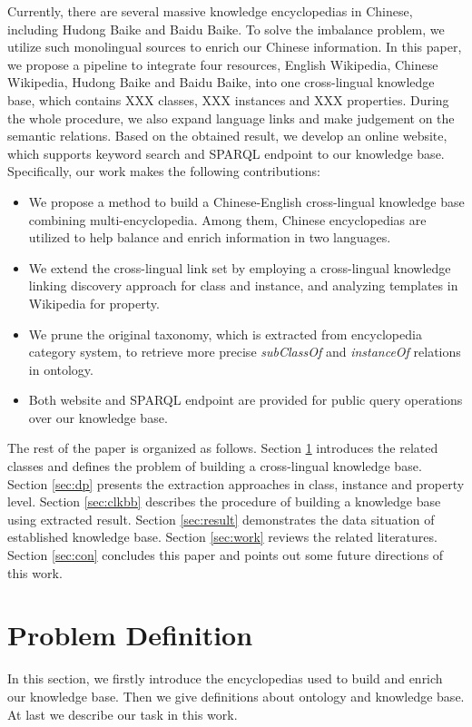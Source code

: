 \documentclass[runningheads,a4paper]{llncs}
\begin{document}
Currently, there are several massive knowledge encyclopedias in Chinese, including Hudong Baike and Baidu Baike. To solve the imbalance problem, we utilize such monolingual sources to enrich our Chinese information. In this paper, we propose a pipeline to integrate four resources, English Wikipedia, Chinese Wikipedia, Hudong Baike and Baidu Baike, into one cross-lingual knowledge base, which contains XXX classes, XXX instances and XXX properties. During the whole procedure, we also expand language links and make judgement on the semantic relations. Based on the obtained result, we develop an online website, which supports keyword search and SPARQL endpoint to our knowledge base. Specifically, our work makes the following contributions:
\begin{itemize}
  \item We propose a method to build a Chinese-English cross-lingual knowledge base combining multi-encyclopedia. Among them, Chinese encyclopedias are utilized to help balance and enrich information in two languages.
  \item We extend the cross-lingual link set by employing a cross-lingual knowledge linking discovery approach for class and instance, and analyzing templates in Wikipedia for property.
  \item We prune the original taxonomy, which is extracted from encyclopedia category system, to retrieve more precise \textit{subClassOf} and \textit{instanceOf} relations in ontology.
  \item Both website and SPARQL endpoint are provided for public query operations over our knowledge base.
\end{itemize}

The rest of the paper is organized as follows. Section \ref{sec:pd} introduces the related classes and defines the problem of building a cross-lingual knowledge base. Section \ref{sec:dp} presents the extraction approaches in class, instance and property level. Section \ref{sec:clkbb} describes the procedure of building a knowledge base using extracted result. Section \ref{sec:result} demonstrates the data situation of established knowledge base. Section \ref{sec:work} reviews the related literatures. Section \ref{sec:con} concludes this paper and points out some future directions of this work.

\section{Problem Definition}
\label{sec:pd}
In this section, we firstly introduce the encyclopedias used to build and enrich our knowledge base. Then we give definitions about ontology and knowledge base. At last we describe our task in this work.
\end{document}
